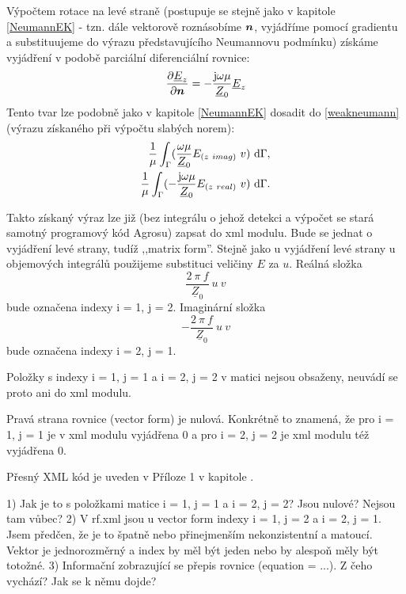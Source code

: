 \documentclass[12pt,a4paper,oneside]{article}
\numberwithin{equation}{section} %
\numberwithin{figure}{section} %
\numberwithin{table}{section} %
\newcommand{\mj}{\mathrm{j}} %
\renewcommand{\vec}[1]{\mbox{\boldmath$#1$}} %
\newcommand{\faz}[1]{{\underline{#1}}} %
\begin{document}
Výpočtem rotace na levé straně (postupuje se stejně jako v kapitole \ref{NeumannEK} - tzn. dále vektorově roznásobíme $\vec{n}$, vyjádříme pomocí gradientu a substituujeme do výrazu představujícího Neumannovu podmínku) získáme vyjádření v podobě parciální diferenciální rovnice:
\begin{equation}
\frac{\partial \faz{E} _z}{\partial \vec{n}} = - \frac{\mj \omega \mu}{\faz{Z} _0} \faz{E} _z
\end{equation}
Tento tvar lze podobně jako v kapitole \ref{NeumannEK} dosadit do \ref{weakneumann} (výrazu získaného při výpočtu slabých norem):
\begin{subequations}
\begin{align}
\frac{1}{\mu} \int _{\Gamma} ( \frac{\omega \mu}{\faz{Z} _0} E _{(z~imag)} ~ v ) ~ \ud \Gamma ,
\\ 
\frac{1}{\mu} \int _{\Gamma} ( - \frac{\mj \omega \mu}{\faz{Z} _0} E _{(z~real)} ~ v ) ~ \ud \Gamma .
\end{align}
\end{subequations}

Takto získaný výraz lze již (bez integrálu o jehož detekci a výpočet se stará samotný programový kód Agrosu) zapsat do xml modulu. Bude se jednat o vyjádření levé strany, tudíž ,,matrix form''. Stejně jako u vyjádření levé strany u objemových integrálů použijeme substituci veličiny $E$ za $u$. Reálná složka 
\begin{equation}
\frac{2 ~ \pi ~ f}{\faz{Z} _0} ~ u ~ v
\end{equation} 
bude označena indexy i = 1, j = 2. Imaginární složka 
\begin{equation}
- \frac{2 ~ \pi ~ f}{\faz{Z} _0} ~ u ~ v
\end{equation}
bude označena indexy i = 2, j = 1.

Položky s indexy i = 1, j = 1 a i = 2, j = 2 v matici nejsou obsaženy, neuvádí se proto ani do xml modulu.

Pravá strana rovnice (vector form) je nulová. Konkrétně to znamená, že pro i = 1, j = 1 je v xml modulu vyjádřena $0$ a pro i = 2, j = 2 je xml modulu též vyjádřena $0$.

Přesný XML kód je uveden v Příloze 1 v kapitole .


\begin{spverbatim}
1) Jak je to s položkami matice i = 1, j = 1 a i = 2, j = 2? Jsou nulové? Nejsou tam vůbec?
2) V rf.xml jsou u vector form indexy i = 1, j = 2 a i = 2, j = 1. Jsem předčen, že je to špatně nebo přinejmenším nekonzistentní a matoucí. Vektor je jednorozměrný a index by měl být jeden nebo by alespoň měly být totožné.
3) Informační zobrazující se přepis rovnice (equation = ...). Z čeho vychází? Jak se k němu dojde?
\end{spverbatim}
\end{document}
